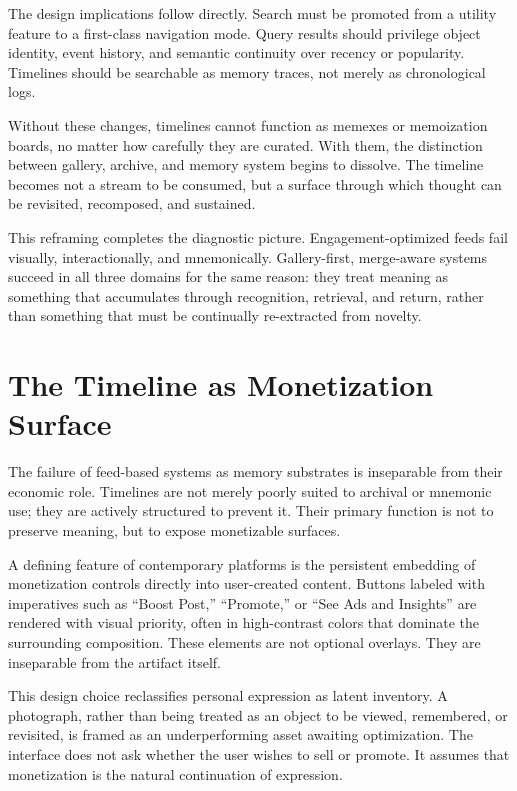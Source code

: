 \documentclass[11pt,oneside]{article}
\begin{document}
The design implications follow directly. Search must be promoted from a utility feature to a first-class navigation mode. Query results should privilege object identity, event history, and semantic continuity over recency or popularity. Timelines should be searchable as memory traces, not merely as chronological logs.

Without these changes, timelines cannot function as memexes or memoization boards, no matter how carefully they are curated. With them, the distinction between gallery, archive, and memory system begins to dissolve. The timeline becomes not a stream to be consumed, but a surface through which thought can be revisited, recomposed, and sustained.

This reframing completes the diagnostic picture. Engagement-optimized feeds fail visually, interactionally, and mnemonically. Gallery-first, merge-aware systems succeed in all three domains for the same reason: they treat meaning as something that accumulates through recognition, retrieval, and return, rather than something that must be continually re-extracted from novelty.

\section{The Timeline as Monetization Surface}

The failure of feed-based systems as memory substrates is inseparable from their economic role. Timelines are not merely poorly suited to archival or mnemonic use; they are actively structured to prevent it. Their primary function is not to preserve meaning, but to expose monetizable surfaces.

A defining feature of contemporary platforms is the persistent embedding of monetization controls directly into user-created content. Buttons labeled with imperatives such as “Boost Post,” “Promote,” or “See Ads and Insights” are rendered with visual priority, often in high-contrast colors that dominate the surrounding composition. These elements are not optional overlays. They are inseparable from the artifact itself.

This design choice reclassifies personal expression as latent inventory. A photograph, rather than being treated as an object to be viewed, remembered, or revisited, is framed as an underperforming asset awaiting optimization. The interface does not ask whether the user wishes to sell or promote. It assumes that monetization is the natural continuation of expression.
\end{document}
